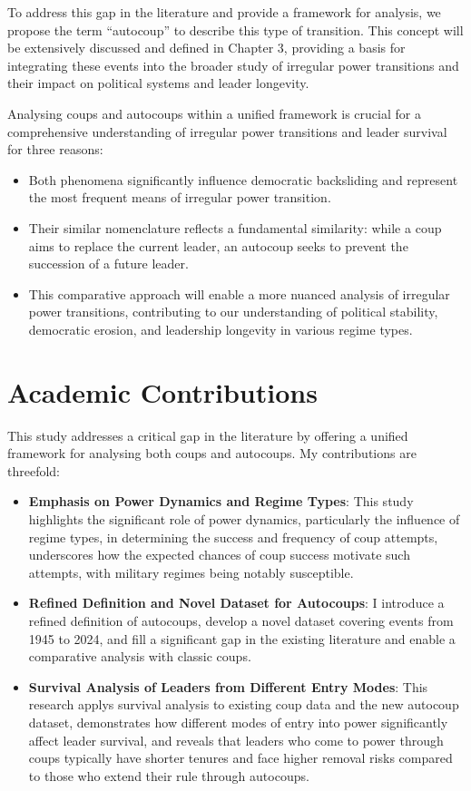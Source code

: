 \documentclass[
  12pt,
]{report}
\providecommand{\tightlist}{%
  \setlength{\itemsep}{0pt}\setlength{\parskip}{0pt}}\usepackage{longtable,booktabs,array}
\begin{document}
To address this gap in the literature and provide a framework for
analysis, we propose the term ``autocoup'' to describe this type of
transition. This concept will be extensively discussed and defined in
Chapter 3, providing a basis for integrating these events into the
broader study of irregular power transitions and their impact on
political systems and leader longevity.

Analysing coups and autocoups within a unified framework is crucial for
a comprehensive understanding of irregular power transitions and leader
survival for three reasons:

\begin{itemize}
\tightlist
\item
  Both phenomena significantly influence democratic backsliding and
  represent the most frequent means of irregular power transition.
\item
  Their similar nomenclature reflects a fundamental similarity: while a
  coup aims to replace the current leader, an autocoup seeks to prevent
  the succession of a future leader.
\item
  This comparative approach will enable a more nuanced analysis of
  irregular power transitions, contributing to our understanding of
  political stability, democratic erosion, and leadership longevity in
  various regime types.
\end{itemize}

\section{Academic Contributions}\label{academic-contributions}

This study addresses a critical gap in the literature by offering a
unified framework for analysing both coups and autocoups. My
contributions are threefold:

\begin{itemize}
\tightlist
\item
  \textbf{Emphasis on Power Dynamics and Regime Types}: This study
  highlights the significant role of power dynamics, particularly the
  influence of regime types, in determining the success and frequency of
  coup attempts, underscores how the expected chances of coup success
  motivate such attempts, with military regimes being notably
  susceptible.
\item
  \textbf{Refined Definition and Novel Dataset for Autocoups}: I
  introduce a refined definition of autocoups, develop a novel dataset
  covering events from 1945 to 2024, and fill a significant gap in the
  existing literature and enable a comparative analysis with classic
  coups.
\item
  \textbf{Survival Analysis of Leaders from Different Entry Modes}: This
  research applys survival analysis to existing coup data and the new
  autocoup dataset, demonstrates how different modes of entry into power
  significantly affect leader survival, and reveals that leaders who
  come to power through coups typically have shorter tenures and face
  higher removal risks compared to those who extend their rule through
  autocoups.
\end{itemize}
\end{document}
